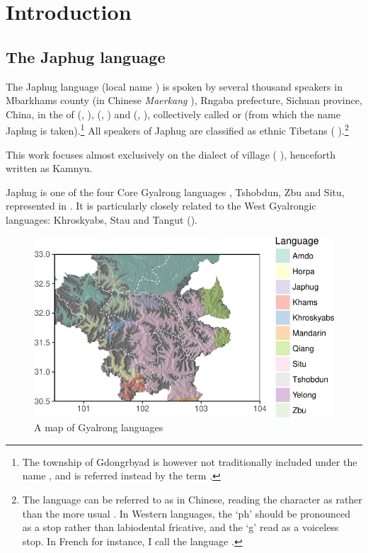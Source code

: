 \chapter{Introduction}

\section{The Japhug language}
The Japhug language (local name ) is spoken by several thousand speakers in Mbarkhams county (in Chinese \textit{Maerkang} ), Rngaba prefecture, Sichuan province, China, in the  of  (,  ),  (,  ) and  (,  ), collectively called  or  (from which the name Japhug is taken).\footnote{The township of Gdongrbyad is however not traditionally included under the name , and is referred instead by the term . }  All speakers of Japhug are classified as ethnic Tibetans ( ).\footnote{The language can be referred to as   in Chinese, reading the character  as   rather than the more usual . In Western languages, the `ph' should be pronounced as a stop rather than labiodental fricative, and the `g' read as a voiceless stop. In French for instance, I call the language . }

This work focuses almost exclusively on the dialect of  village ( ), henceforth written as Kamnyu.
  
Japhug is one of the four Core Gyalrong languages \citep{jackson00sidaba}, Tshobdun, Zbu and Situ, represented in . It is particularly closely related to the West Gyalrongic languages: Khroskyabs, Stau  and Tangut (\citealt{jackson00puxi, jacques17stau}).
    
 \begin{figure}
\caption{A map of Gyalrong languages} \label{fig:map.rgyalrong}
\includegraphics[width=\textwidth]{carte3.pdf}
\end{figure}

